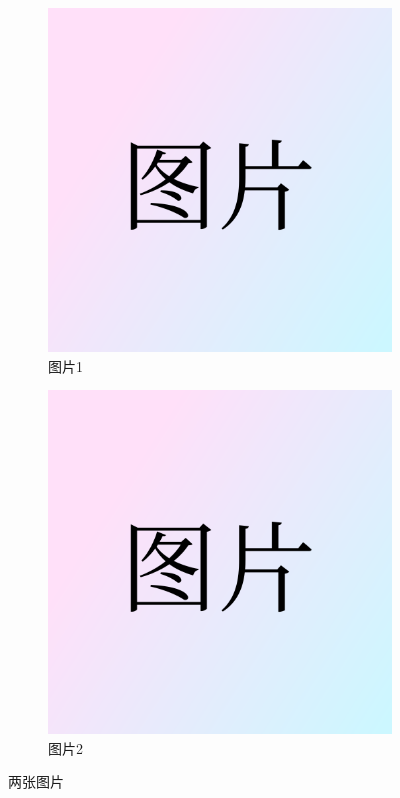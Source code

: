 \documentclass[UTF8,12pt,punct=kaiming,fontset=none]{ctexart}
\begin{document}
    \begin{figure}[H]
        \begin{subfigure}{0.3\linewidth}
            \centering
            \includegraphics[width=\linewidth]{figures/figure.png}
            \caption{图片1}
            \label{fig:a-random-figure}
        \end{subfigure}
        \hspace{1cm}
        \begin{subfigure}{0.3\linewidth}
            \centering
            \includegraphics[width=\linewidth]{figures/figure.png}
            \caption{图片2}
            \label{fig:another-random-figure}
        \end{subfigure}
        \caption{两张图片}
        \label{fig:some-random-figure}
    \end{figure}
\end{document}
